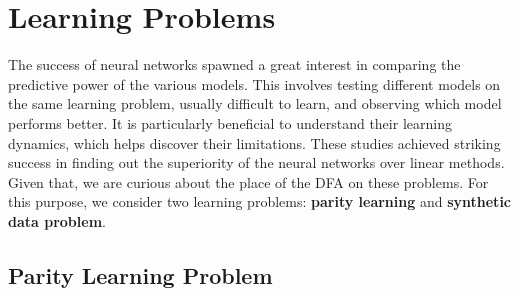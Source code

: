 \documentclass[a4paper, nobind]{templates/ociamthesis}
\begin{document}
\hypertarget{chap:chapter_2}{%
\chapter{Learning Problems}\label{chap:chapter_2}}

\minitoc 

\noindent The success of neural networks spawned a great interest in comparing the predictive power of the various models. This involves testing different models on the same learning problem, usually difficult to learn, and observing which model performs better. It is particularly beneficial to understand their learning dynamics, which helps discover their limitations. These studies achieved striking success in finding out the superiority of the neural networks over linear methods. Given that, we are curious about the place of the DFA on these problems. For this purpose, we consider two learning problems: \textbf{parity learning} and \textbf{synthetic data problem}.

\hypertarget{parity-learning-problem}{%
\section{Parity Learning Problem}\label{parity-learning-problem}}
\end{document}
